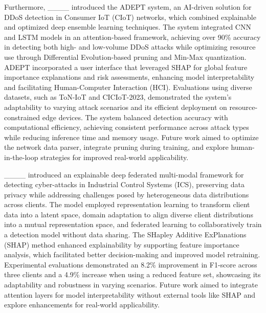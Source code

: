 Furthermore, ____ introduced the ADEPT system, an AI-driven solution for DDoS detection in Consumer IoT (CIoT) networks, which combined explainable and optimized deep ensemble learning techniques. The system integrated CNN and LSTM models in an attention-based framework, achieving over 90\% accuracy in detecting both high- and low-volume DDoS attacks while optimizing resource use through Differential Evolution-based pruning and Min-Max quantization. ADEPT incorporated a user interface that leveraged SHAP for global feature importance explanations and risk assessments, enhancing model interpretability and facilitating Human-Computer Interaction (HCI). Evaluations using diverse datasets, such as ToN-IoT and CICIoT-2023, demonstrated the system's adaptability to varying attack scenarios and its efficient deployment on resource-constrained edge devices. The system balanced detection accuracy with computational efficiency, achieving consistent performance across attack types while reducing inference time and memory usage. Future work aimed to optimize the network data parser, integrate pruning during training, and explore human-in-the-loop strategies for improved real-world applicability.

____ introduced an explainable deep federated multi-modal framework for detecting cyber-attacks in Industrial Control Systems (ICS), preserving data privacy while addressing challenges posed by heterogeneous data distributions across clients. The model employed representation learning to transform client data into a latent space, domain adaptation to align diverse client distributions into a mutual representation space, and federated learning to collaboratively train a detection model without data sharing. The SHapley Additive ExPlanations (SHAP) method enhanced explainability by supporting feature importance analysis, which facilitated better decision-making and improved model retraining. Experimental evaluations demonstrated an 8.2\% improvement in F1-score across three clients and a 4.9\% increase when using a reduced feature set, showcasing its adaptability and robustness in varying scenarios. Future work aimed to integrate attention layers for model interpretability without external tools like SHAP and explore enhancements for real-world applicability.

